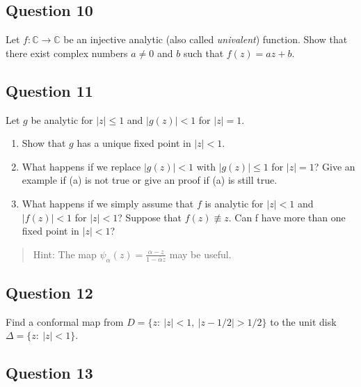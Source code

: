 \documentclass[12pt]{article}
\begin{document}
\hypertarget{question-10-2}{%
\subsection{Question 10}\label{question-10-2}}

Let \(f: {\mathbb C} \rightarrow {\mathbb C}\) be an injective analytic
(also called \emph{univalent}) function. Show that there exist complex
numbers \(a \neq 0\) and \(b\) such that \(f(z) = az + b\).

\hypertarget{question-11-2}{%
\subsection{Question 11}\label{question-11-2}}

Let \(g\) be analytic for \(|z|\leq 1\) and \(|g(z)| < 1\) for
\(|z| = 1\).

\begin{enumerate}
\def\labelenumi{\arabic{enumi}.}
\item
  Show that \(g\) has a unique fixed point in \(|z| < 1\).
\item
  What happens if we replace \(|g(z)| < 1\) with \(|g(z)|\leq 1\) for
  \(|z|=1\)? Give an example if (a) is not true or give an proof if (a)
  is still true.
\item
  What happens if we simply assume that \(f\) is analytic for
  \(|z| < 1\) and \(|f(z)| < 1\) for \(|z| < 1\)? Suppose that
  \(f(z) \not\equiv z\). Can f have more than one fixed point in
  \(|z| < 1\)?
\end{enumerate}

\begin{quote}
Hint: The map
\(\displaystyle{\psi_{\alpha}(z)=\frac{\alpha-z}{1-\bar{\alpha}z}}\) may
be useful.
\end{quote}

\hypertarget{question-12-2}{%
\subsection{Question 12}\label{question-12-2}}

Find a conformal map from \(D = \{z :\  |z| < 1,\ |z - 1/2| > 1/2\}\) to
the unit disk \(\Delta=\{z: \ |z|<1\}\).

\hypertarget{question-13-2}{%
\subsection{Question 13}\label{question-13-2}}
\end{document}

